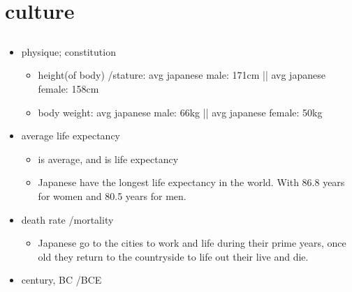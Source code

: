 \documentclass{article}
\newcommand\tabni[1][0.2cm]{\hspace*{#1}}
\begin{document}
\section{ \tabni culture }
\subsection{}
\begin{itemize}
    \item {} physique; constitution
    \begin{itemize}
        \item {} height(of body) /stature: avg japanese male: 171cm || avg japanese female: 158cm
        \item {} body weight: avg japanese male: 66kg || avg japanese female: 50kg
    \end{itemize}
    \item {} average life expectancy
    \begin{itemize}
        \item {} is average, and  is life expectancy
        \item Japanese have the longest life expectancy in the world. With 86.8 years for women and 80.5 years for men.
    \end{itemize}
    \item {} death rate /mortality
    \begin{itemize}
        \item Japanese go to the cities to work and life during their prime years, once old they return to the countryside to life out their live and die.
    \end{itemize}
    \item {} century,   BC /BCE
\end{itemize}
\end{document}
